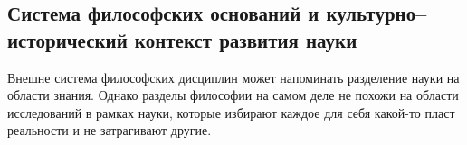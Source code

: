 
\subsection{Система философских оснований и культурно--исторический контекст развития
науки}

Внешне система философских дисциплин может напоминать разделение науки на области знания. 
Однако разделы философии на самом деле не похожи на области исследований
в рамках науки, которые избирают каждое для себя какой-то пласт реальности и не
затрагивают другие. 

